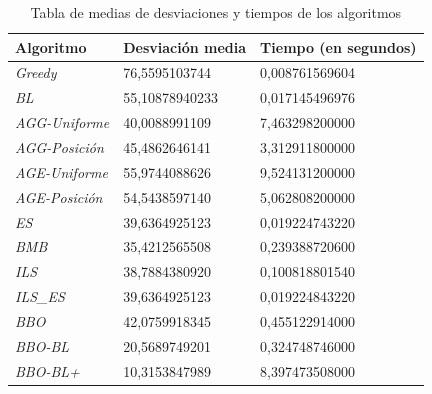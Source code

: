 \documentclass{article}
\begin{document}
\begin{table}[h]
	\begin{center}
		\begin{spacing}{1.5}
			\begin{tabular}{| l | l | l | }
				\hline
				\textbf{Algoritmo}    & \textbf{Desviación media} & \textbf{Tiempo (en segundos)} \\ \hline
				\emph{Greedy}         & 76,5595103744             & 0,008761569604                \\ \hline

				\emph{BL}             & 55,10878940233            & 0,017145496976                \\ \hline

				\emph{AGG-Uniforme}   & 40,0088991109             & 7,463298200000                \\ \hline

				\emph{AGG-Posición}   & 45,4862646141             & 3,312911800000                \\ \hline

				\emph{AGE-Uniforme}   & 55,9744088626             & 9,524131200000                \\ \hline

				\emph{AGE-Posición}   & 54,5438597140             & 5,062808200000                \\ \hline

%
%
				
				\emph{ES} & 39,6364925123 & 0,019224743220 \\ \hline
				\emph{BMB} & 35,4212565508 & 0,239388720600 \\ \hline
				\emph{ILS} & 38,7884380920 & 0,100818801540 \\ \hline
				\emph{ILS\_ES} & 39,6364925123  & 0,019224843220 \\ \hline 

				\emph{BBO}			& 42,0759918345          & 0,455122914000               \\ \hline

				\emph{BBO-BL}		& 20,5689749201             & 0,324748746000               \\ \hline

				\emph{BBO-BL+}	& 10,3153847989 		   & 8,397473508000               \\ \hline
			
			\end{tabular}
		\end{spacing}
		\caption{Tabla de medias de desviaciones y tiempos de los algoritmos}
	\end{center}
\end{table}
\end{document}
